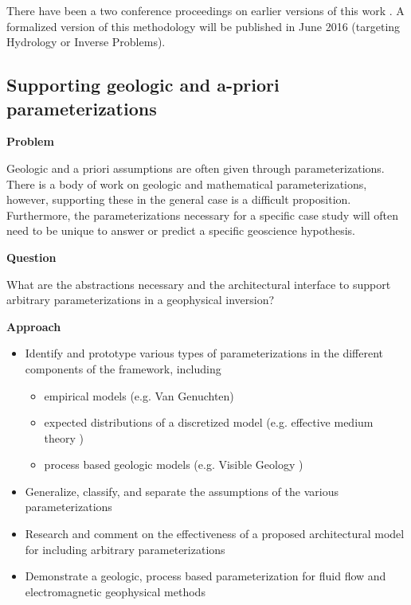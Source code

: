 \documentclass[11pt]{article}
\begin{document}
There have been a two conference proceedings on earlier versions of this work \citep{Cockett2013a, Cockett2013}. A formalized version of this methodology will be published in June 2016 (targeting Hydrology or Inverse Problems).

\subsection{Supporting geologic and a-priori parameterizations}

\noindent
{\bf Problem}

\noindent
Geologic and a priori assumptions are often given through parameterizations. There is a body of work on geologic and mathematical parameterizations, however, supporting these in the general case is a difficult proposition. Furthermore, the parameterizations necessary for a specific case study will often need to be unique to answer or predict a specific geoscience hypothesis.

\noindent
{\bf Question}

\noindent
What are the abstractions necessary and the architectural interface to support arbitrary parameterizations in a geophysical inversion?

\noindent
{\bf Approach}

\noindent
\begin{itemize}
    \item Identify and prototype various types of parameterizations in the different components of the framework, including
    \begin{itemize}
        \item empirical models (e.g. Van Genuchten)
        \item expected distributions of a discretized model (e.g. effective medium theory \cite{HeagySEG2014})
        \item process based geologic models (e.g. Visible Geology \cite{Cockett2016})
    \end{itemize}
    \item Generalize, classify, and separate the assumptions of the various parameterizations
    \item Research and comment on the effectiveness of a proposed architectural model for including arbitrary parameterizations
    \item Demonstrate a geologic, process based parameterization for fluid flow and electromagnetic geophysical methods
\end{itemize}
\end{document}
